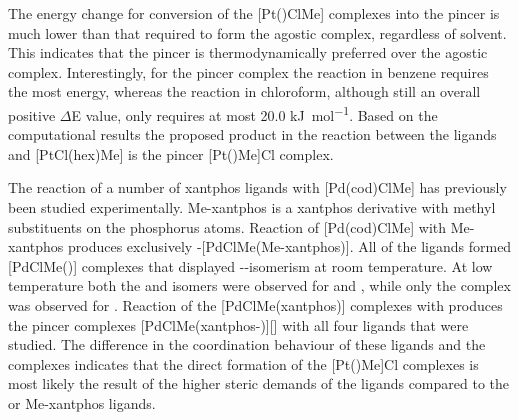 The energy change for conversion of the [Pt(\tBuxantphos)ClMe] complexes into the pincer is much lower than that required to form the agostic complex, regardless of solvent.  This indicates that the pincer is thermodynamically preferred over the agostic complex.  Interestingly, for the pincer complex the reaction in benzene requires the most energy, whereas the reaction in chloroform, although still an overall positive $\Delta$E value, only requires at most 20.0 \si{\kilo\joule\per\mole}.  Based on the computational results the proposed product in the reaction between the \tBuxantphos{} ligands and [PtCl(\acrshort{hex})Me] is the pincer [Pt(\tBuxantphosk)Me]Cl complex.

The reaction of a number of xantphos ligands with [Pd(cod)ClMe] has previously been studied experimentally.\cite{Zuideveld2002}  Me-xantphos is a xantphos derivative with methyl substituents on the phosphorus atoms.  Reaction of [Pd(cod)ClMe] with Me-xantphos produces exclusively \cis{}-[PdClMe(Me-xantphos)].  All of the \Phxantphos{} ligands formed [PdClMe(\Phxantphos)] complexes that displayed \cis{}-\trans{}-isomerism at room temperature.  At low temperature both the \cis{} and \trans{} isomers were observed for \Phthixantphos{} and \Phxantphos{}, while only the \cis{} complex was observed for \Phxantphos{}.  Reaction of the [PdClMe(xantphos)] complexes with  produces the pincer complexes [PdClMe(xantphos-\POP{})][] with all four ligands that were studied.  The difference in the coordination behaviour of these ligands and the \tBuxantphos{} complexes indicates that the direct formation of the [Pt(\tBuxantphos)Me]Cl complexes is most likely the result of the higher steric demands of the \tBuxantphos{} ligands compared to the \Phxantphos{} or Me-xantphos ligands.


